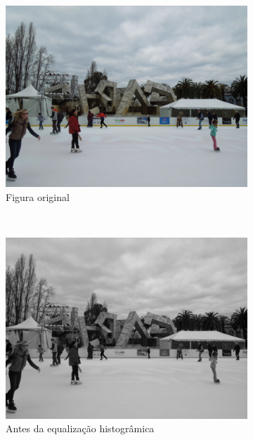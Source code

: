 \documentclass[10pt,a4paper]{article}
\begin{document}
\begin{figure}[!ht]
    \centering
    \begin{subfigure}[ht]{0.45\textwidth}
        \includegraphics[width=\textwidth]{original.jpg}
        \caption{Figura original}
        \label{fig:original}
    \end{subfigure}
    \\
    \begin{subfigure}[ht]{0.45\textwidth}
        \includegraphics[width=\textwidth]{src.jpg}
        \caption{Antes da equalização histogrâmica}
        \label{fig:src}
    \end{subfigure}
    \qquad
    \begin{subfigure}[ht]{0.45\textwidth}

\end{subfigure}
\end{figure}
\end{document}

